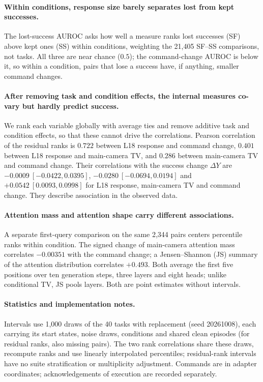 \paragraph{Within conditions, response size barely separates lost from kept successes.}
The lost-success AUROC asks how well a measure ranks lost successes (SF) above kept ones (SS) within conditions, weighting the 21,405 SF--SS comparisons, not tasks. All three are near chance ($0.5$); the command-change AUROC is below it, so within a condition, pairs that lose a success have, if anything, smaller command changes.

\paragraph{After removing task and condition effects, the internal measures co-vary but hardly predict success.}
We rank each variable globally with average ties and remove additive task and condition effects, so that these cannot drive the correlations. Pearson correlation of the residual ranks is $0.722$ between L18 response and command change, $0.401$ between L18 response and main-camera TV, and $0.286$ between main-camera TV and command change. Their correlations with the success change $\Delta Y$ are $-0.0009\ [-0.0422,0.0395]$, $-0.0280\ [-0.0694,0.0194]$ and $+0.0542\ [0.0093,0.0998]$ for L18 response, main-camera TV and command change. They describe association in the observed data.

\paragraph{Attention mass and attention shape carry different associations.}
A separate first-query comparison on the same 2,344 pairs centers percentile ranks within condition. The signed change of main-camera attention mass correlates $-0.00351$ with the command change; a Jensen--Shannon (JS) summary of the attention distribution correlates $+0.493$. Both average the first five positions over ten generation steps, three layers and eight heads; unlike conditional TV, JS pools layers. Both are point estimates without intervals.

\paragraph{Statistics and implementation notes.}
Intervals use 1,000 draws of the 40 tasks with replacement (seed 20261008), each carrying its start states, noise draws, conditions and shared clean episodes (for residual ranks, also missing pairs). The two rank correlations share these draws, recompute ranks and use linearly interpolated percentiles; residual-rank intervals have no suite stratification or multiplicity adjustment. Commands are in adapter coordinates; acknowledgements of execution are recorded separately.


